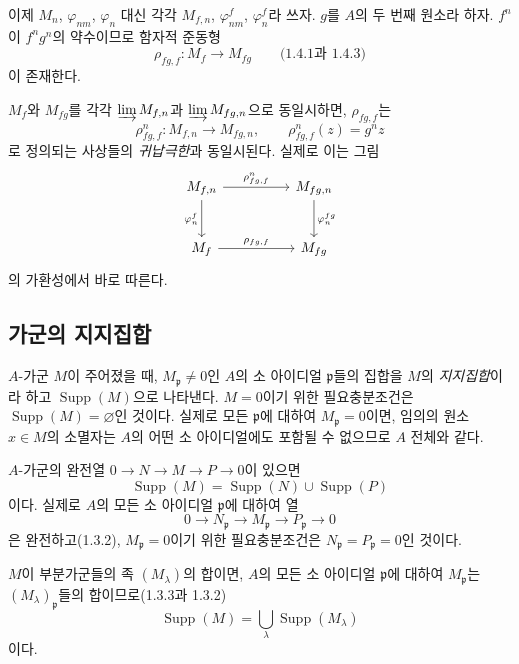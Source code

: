 \begin{env}[1.6.2]
\label{0.1.6.2-ko}
이제 $M_n$, $\varphi_{nm}$, $\varphi_n$ 대신 각각 $M_{f,n}$, $\varphi_{nm}^f$, $\varphi_n^f$라 쓰자. $g$를 $A$의 두 번째 원소라 하자. $f^n$이 $f^ng^n$의 약수이므로 함자적 준동형
\[
  \rho_{fg,f}:M_f\longrightarrow M_{fg}\qquad\text{(1.4.1과 1.4.3)}
\]
이 존재한다.


$M_f$와 $M_{fg}$를 각각 $\varinjlim M_{f,n}$과 $\varinjlim M_{fg,n}$으로 동일시하면, $\rho_{fg,f}$는
\[
  \rho_{fg,f}^n:M_{f,n}\longrightarrow M_{fg,n},
  \qquad \rho_{fg,f}^n(z)=g^nz
\]
로 정의되는 사상들의 \emph{귀납극한}과 동일시된다. 실제로 이는 그림
\[
\begin{tikzcd}[column sep=huge,row sep=large]
M_{f,n} \arrow[r,"\rho_{fg,f}^n"] \arrow[d,"\varphi_n^f"']
  & M_{fg,n} \arrow[d,"\varphi_n^{fg}"] \\
M_f \arrow[r,"\rho_{fg,f}"]
  & M_{fg}
\end{tikzcd}
\]
의 가환성에서 바로 따른다.
\end{env}

\subsection{가군의 지지집합}
\label{subsection:0.1.7-ko}

\begin{env}[1.7.1]
\label{0.1.7.1-ko}
$A$-가군 $M$이 주어졌을 때, $M_{\mathfrak p}\neq0$인 $A$의 소 아이디얼 $\mathfrak p$들의 집합을 $M$의 \emph{지지집합}이라 하고 $\operatorname{Supp}(M)$으로 나타낸다. $M=0$이기 위한 필요충분조건은 $\operatorname{Supp}(M)=\varnothing$인 것이다. 실제로 모든 $\mathfrak p$에 대하여 $M_{\mathfrak p}=0$이면, 임의의 원소 $x\in M$의 소멸자는 $A$의 어떤 소 아이디얼에도 포함될 수 없으므로 $A$ 전체와 같다.
\end{env}

\begin{env}[1.7.2]
\label{0.1.7.2-ko}
$A$-가군의 완전열 $0\to N\to M\to P\to0$이 있으면
\[
  \operatorname{Supp}(M)=\operatorname{Supp}(N)\cup\operatorname{Supp}(P)
\]
이다. 실제로 $A$의 모든 소 아이디얼 $\mathfrak p$에 대하여 열
\[
  0\longrightarrow N_{\mathfrak p}\longrightarrow M_{\mathfrak p}
  \longrightarrow P_{\mathfrak p}\longrightarrow0
\]
은 완전하고(1.3.2), $M_{\mathfrak p}=0$이기 위한 필요충분조건은 $N_{\mathfrak p}=P_{\mathfrak p}=0$인 것이다.
\end{env}

\begin{env}[1.7.3]
\label{0.1.7.3-ko}
$M$이 부분가군들의 족 $(M_\lambda)$의 합이면, $A$의 모든 소 아이디얼 $\mathfrak p$에 대하여 $M_{\mathfrak p}$는 $(M_\lambda)_{\mathfrak p}$들의 합이므로(1.3.3과 1.3.2)
\[
  \operatorname{Supp}(M)=\bigcup_\lambda\operatorname{Supp}(M_\lambda)
\]
이다.
\end{env}

